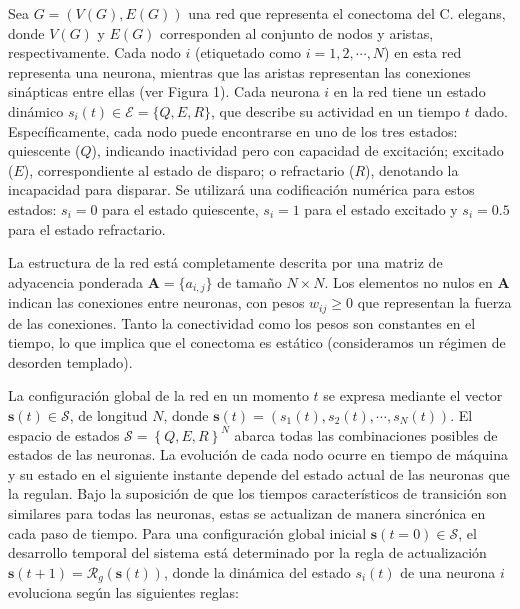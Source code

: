 \begin{definitionT}\label{def_modelo}
		
Sea $G=(V(G), E(G))$ una red  que  representa el conectoma del C. elegans, donde $V(G)$ y $E(G)$ corresponden al conjunto de nodos y aristas, respectivamente. Cada nodo $i$ (etiquetado como $i = 1, 2, \cdots, N$) en esta red representa una neurona, mientras que las aristas representan las conexiones sinápticas entre ellas (ver Figura 1). Cada neurona $i$ en la red tiene un estado dinámico $s_i(t) \in \mathcal{E} = \{Q, E, R\}$, que describe su actividad en un tiempo $t$ dado.  Específicamente, cada nodo puede encontrarse en uno de los tres estados: quiescente ($Q$), indicando inactividad pero con capacidad de excitación; excitado ($E$), correspondiente al estado de disparo; o refractario ($R$), denotando la incapacidad para disparar.  Se utilizará  una codificación numérica para estos estados: $s_i = 0$ para el estado quiescente, $s_i = 1$ para el estado excitado y $s_i = 0.5$ para el estado refractario.
	
La estructura de la red está completamente descrita por una matriz de adyacencia ponderada $\bm{A} = \{a_{i,j}\}$ de tamaño $N\times N$.  Los elementos no nulos en $\bm{A}$ indican las conexiones entre neuronas, con pesos $w_{ij} \geq 0$ que representan la fuerza de las conexiones. Tanto la conectividad como los pesos son constantes en el tiempo, lo que implica que el conectoma es estático (consideramos un régimen de desorden templado).
	
	
La configuración global de la red en un momento $t$ se expresa mediante el vector $\mathbf{s}(t)\in\mathcal{S}$, de longitud $N$, donde $\mathbf{s}(t) = (s_1(t), s_2(t), \cdots, s_N(t))$. El espacio de estados $\mathcal{S} = \left\{Q,E,R\right\}^N$ abarca todas las combinaciones posibles de estados de las neuronas. La evolución de cada nodo ocurre en tiempo de máquina y su estado en el siguiente instante depende del estado actual de las neuronas que la regulan. Bajo la suposición de que los tiempos característicos de transición son similares para todas las neuronas, estas se actualizan de manera sincrónica en cada paso de tiempo.  Para una configuración global inicial $\mathbf{s}(t = 0) \in \mathcal{S}$, el desarrollo temporal del sistema está determinado por la regla de actualización $\mathbf{s}(t + 1) = \mathcal{R}_g(\mathbf{s}(t))$, donde la dinámica del estado $s_i(t)$ de una neurona $i$ evoluciona según las siguientes reglas:
	

\end{definitionT}
